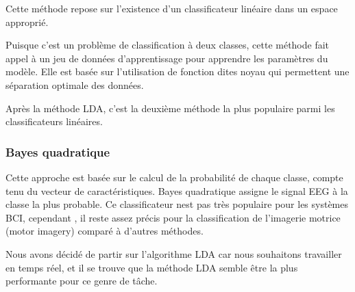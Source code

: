 Cette méthode repose sur l'existence d’un classificateur linéaire dans un espace approprié. 

Puisque c’est un problème de classification à deux classes, cette méthode fait appel à un jeu de données d'apprentissage pour apprendre les paramètres du modèle. Elle est basée sur l'utilisation de fonction dites noyau qui permettent une séparation optimale des données. 

Après la méthode  LDA, c'est la deuxième méthode la plus populaire parmi les classificateurs linéaires.

\subsubsection{Bayes quadratique}
\label{subsubsection : 4.Bayes Quadratique}
Cette approche est basée sur le calcul de la probabilité de chaque classe, compte tenu du vecteur de caractéristiques. Bayes quadratique assigne le signal EEG à la classe la plus probable. Ce classificateur nest pas très populaire pour les systèmes BCI, cependant , il reste assez précis pour la classification de l'imagerie motrice (motor imagery) comparé à d'autres méthodes.

Nous avons décidé de partir sur l'algorithme LDA car nous souhaitons travailler en temps réel, et il se trouve que la méthode LDA  semble être la plus performante pour ce genre de tâche.






